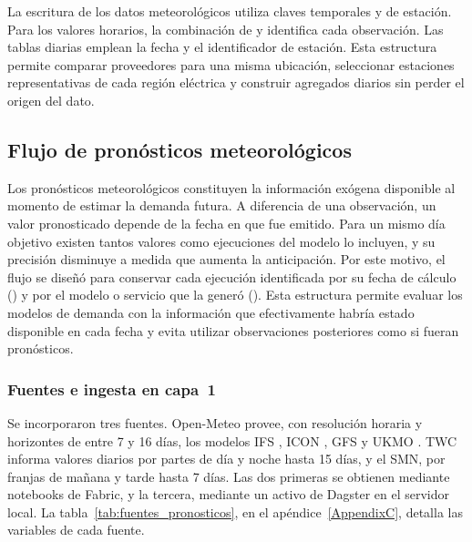 La escritura de los datos meteorológicos utiliza claves temporales y de estación. Para los valores horarios, la combinación de  y  identifica cada observación. Las tablas diarias emplean la fecha y el identificador de estación. Esta estructura permite comparar proveedores para una misma ubicación, seleccionar estaciones representativas de cada región eléctrica y construir agregados diarios sin perder el origen del dato.

\subsection{Flujo de pronósticos meteorológicos}
\label{subsec:pipeline_pronosticos}

Los pronósticos meteorológicos constituyen la información exógena disponible al momento de estimar la demanda futura. A diferencia de una observación, un valor pronosticado depende de la fecha en que fue emitido. Para un mismo día objetivo existen tantos valores como ejecuciones del modelo lo incluyen, y su precisión disminuye a medida que aumenta la anticipación. Por este motivo, el flujo se diseñó para conservar cada ejecución identificada por su fecha de cálculo () y por el modelo o servicio que la generó (). Esta estructura permite evaluar los modelos de demanda con la información que efectivamente habría estado disponible en cada fecha y evita utilizar observaciones posteriores como si fueran pronósticos.

\subsubsection{Fuentes e ingesta en capa~1}

Se incorporaron tres fuentes. Open-Meteo provee, con resolución horaria y horizontes de entre 7 y 16 días, los modelos IFS \cite{ecmwfIFS}, ICON \cite{zangl2015icon}, GFS \cite{noaaGFS} y UKMO \cite{walters2019ukmo}. TWC informa valores diarios por partes de día y noche hasta 15 días, y el SMN, por franjas de mañana y tarde hasta 7 días. Las dos primeras se obtienen mediante notebooks de Fabric, y la tercera, mediante un activo de Dagster en el servidor local. La tabla~\ref{tab:fuentes_pronosticos}, en el apéndice~\ref{AppendixC}, detalla las variables de cada fuente.

